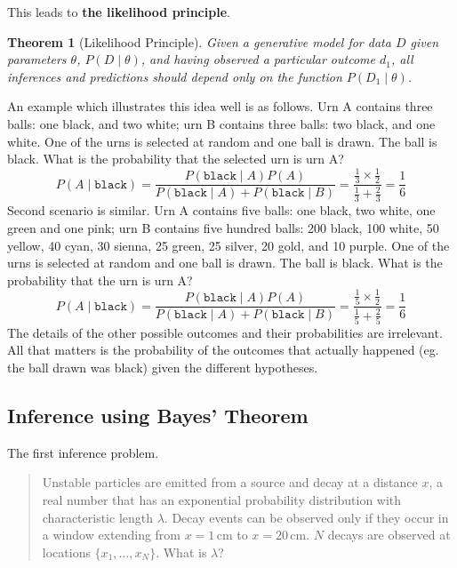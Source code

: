 \documentclass[11pt]{article}
\newtheorem{theorem}{Theorem}
\begin{document}
This leads to \textbf{the likelihood principle}.

\begin{theorem}[Likelihood Principle]
Given a generative model for data $D$ given parameters $\theta$, $P(D\mid \theta)$, and having observed a particular outcome $d_1$, all inferences and predictions should depend only on the function $P(D_1\mid \theta)$.
\end{theorem}

An example which illustrates this idea well is as follows. Urn A contains three balls: one black, and two white; urn B contains three balls: two black, and one white. One of the urns is selected at random and one ball is drawn. The ball is black. What is the probability that the selected urn is urn A? 
\[
    P(A \mid \mathtt{black}) = \frac{P(\mathtt{black}\mid A)P(A)}{P(\mathtt{black}\mid A)+P(\mathtt{black}\mid B)} = \frac{\frac{1}{3}\times \frac{1}{2}}{\frac{1}{3} + \frac{2}{3}} = \frac{1}{6}
\]
Second scenario is similar. Urn A contains five balls: one black, two white, one green and one pink; urn B contains five hundred balls: 200 black, 100 white, 50 yellow, 40 cyan, 30 sienna, 25 green, 25 silver, 20 gold, and 10 purple. One of the urns is selected at random and one ball is drawn. The ball is black. What is the probability that the urn is urn A?
\[
    P(A \mid \mathtt{black}) = \frac{P(\mathtt{black}\mid A)P(A)}{P(\mathtt{black}\mid A)+P(\mathtt{black}\mid B)} = \frac{\frac{1}{5}\times \frac{1}{2}}{\frac{1}{5} + \frac{2}{5}} = \frac{1}{6}
\]
The details of the other possible outcomes and their probabilities are irrelevant. All that matters is the probability of the outcomes that actually happened (eg. the ball drawn was black) given the different hypotheses.

\subsection{Inference using Bayes' Theorem}

The first inference problem.
\begin{quote}
Unstable particles are emitted from a source and decay at a distance $x$, a real number that has an exponential probability distribution with characteristic length $\lambda$. Decay events can be observed only if they occur in a window extending from $x=1\,\mathrm{cm}$ to $x=20\,\mathrm{cm}$. $N$ decays are observed at locations $\{x_1,\ldots,x_N\}$. What is $\lambda$?
\end{quote}
\end{document}
